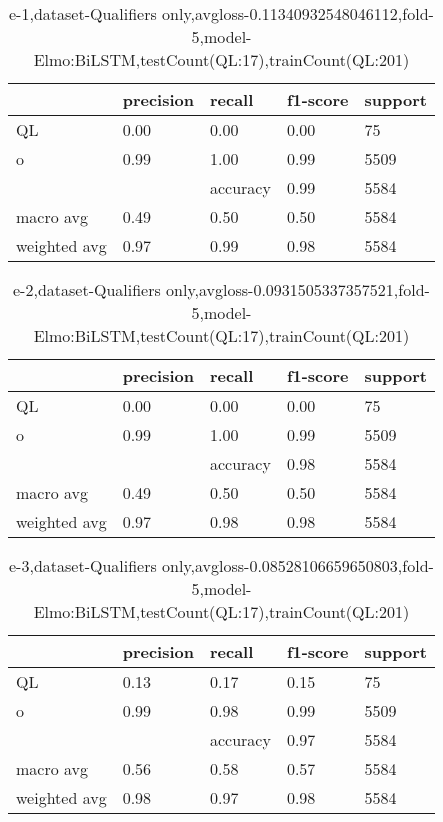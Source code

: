 \begin{table}[!ht] 
\centering
\caption{e-1,dataset-Qualifiers only,avgloss-0.11340932548046112,fold-5,model-Elmo:BiLSTM,testCount(QL:17),trainCount(QL:201)}\label{e-1data-qualS.tsv}
\begin{tabularx}{300pt}{|X|X|X|X|X|}
\hline
&precision&recall&f1-score&support\\
\hline
QL&0.00&0.00&0.00&75\\
\hline
o&0.99&1.00&0.99&5509\\
\hline
&&accuracy&0.99&5584\\
\hline
macro avg&0.49&0.50&0.50&5584\\
\hline
weighted avg&0.97&0.99&0.98&5584\\
\hline
\end{tabularx}
\end{table}
\begin{table}[!ht] 
\centering
\caption{e-2,dataset-Qualifiers only,avgloss-0.0931505337357521,fold-5,model-Elmo:BiLSTM,testCount(QL:17),trainCount(QL:201)}\label{e-2data-qualS.tsv}
\begin{tabularx}{300pt}{|X|X|X|X|X|}
\hline
&precision&recall&f1-score&support\\
\hline
QL&0.00&0.00&0.00&75\\
\hline
o&0.99&1.00&0.99&5509\\
\hline
&&accuracy&0.98&5584\\
\hline
macro avg&0.49&0.50&0.50&5584\\
\hline
weighted avg&0.97&0.98&0.98&5584\\
\hline
\end{tabularx}
\end{table}
\begin{table}[!ht] 
\centering
\caption{e-3,dataset-Qualifiers only,avgloss-0.08528106659650803,fold-5,model-Elmo:BiLSTM,testCount(QL:17),trainCount(QL:201)}\label{e-3data-qualS.tsv}
\begin{tabularx}{300pt}{|X|X|X|X|X|}
\hline
&precision&recall&f1-score&support\\
\hline
QL&0.13&0.17&0.15&75\\
\hline
o&0.99&0.98&0.99&5509\\
\hline
&&accuracy&0.97&5584\\
\hline
macro avg&0.56&0.58&0.57&5584\\
\hline
weighted avg&0.98&0.97&0.98&5584\\
\hline
\end{tabularx}
\end{table}
